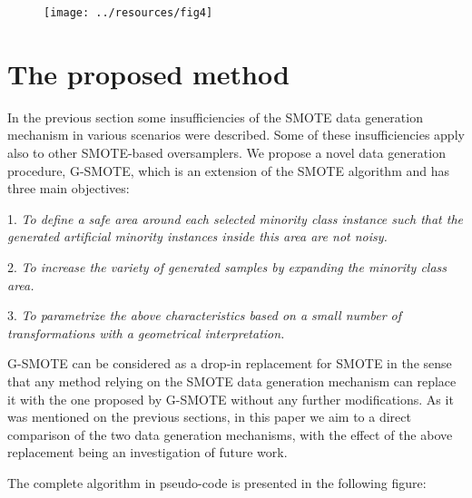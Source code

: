 \documentclass[parskip=full]{scrartcl}
\begin{document}
\begin{figure}[H]
	\centering
	\texttt{[image: ../resources/fig4]}
\end{figure}

\section{The proposed method}

In the previous section some insufficiencies of the SMOTE data generation mechanism in various scenarios were described. Some of these insufficiencies apply also to other SMOTE-based oversamplers. We propose a novel data generation procedure, G-SMOTE, which is an extension of the SMOTE algorithm and has three main objectives:

1. \textit{To define a safe area around each selected minority class instance such that the generated artificial minority instances inside this area are not noisy.}

2. \textit{To increase the variety of generated samples by expanding the minority class area.}

3. \textit{To parametrize the above characteristics based on a small number of transformations with a geometrical interpretation.}

G-SMOTE can be considered as a drop-in replacement for SMOTE in the sense that any method relying on the SMOTE data generation mechanism can replace it with the one proposed by G-SMOTE without any further modifications. As it was mentioned on the previous sections, in this paper we aim to a direct comparison of the two data generation mechanisms, with the effect of the above replacement being an investigation of future work.

The complete algorithm in pseudo-code is presented in the following figure:
\end{document}
